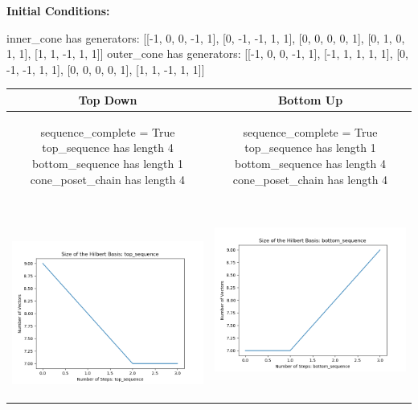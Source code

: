 \documentclass[10pt]{article}
\begin{document}
\textbf{Initial Conditions:}
\begin{SAGE}
inner_cone has generators: 
[[-1, 0, 0, -1, 1], [0, -1, -1, 1, 1], [0, 0, 0, 0, 1], [0, 1, 0, 1, 1], [1, 1, -1, 1, 1]]
outer_cone has generators: 
[[-1, 0, 0, -1, 1], [-1, 1, 1, 1, 1], [0, -1, -1, 1, 1], [0, 0, 0, 0, 1], [1, 1, -1, 1, 1]]

\end{SAGE}
\begin{tabular}{c|c}
\textbf{Top Down} & \textbf{Bottom Up} \\ \hline  
\begin{SAGE}
	sequence_complete = True
	top_sequence has length 4
	bottom_sequence has length 1
	cone_poset_chain has length 4
\end{SAGE} 
&
\begin{SAGE}
	sequence_complete = True
	top_sequence has length 1
	bottom_sequence has length 4
	cone_poset_chain has length 4
\end{SAGE} 
\\ \hline
\
\begin{minipage}{.45\textwidth}
\includegraphics[width=\textwidth]{"DATA/5d/5 generators 1 bound I/top_sequence SIZE"}
\end{minipage} &
\begin{minipage}{.45\textwidth}
\includegraphics[width=\textwidth]{"DATA/5d/5 generators 1 bound I bottomup/bottom_sequence SIZE"}

\end{minipage}
\end{tabular}
\end{document}
